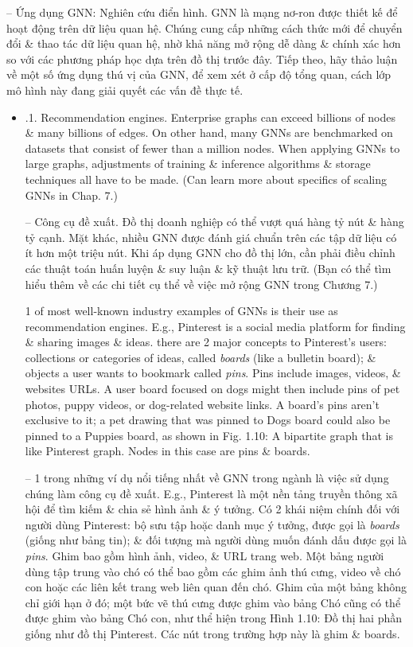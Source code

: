 \documentclass{article}
\begin{document}
\begin{itemize}
\begin{itemize}
        -- {\sf Ứng dụng GNN: Nghiên cứu điển hình.} GNN là mạng nơ-ron được thiết kế để hoạt động trên dữ liệu quan hệ. Chúng cung cấp những cách thức mới để chuyển đổi \& thao tác dữ liệu quan hệ, nhờ khả năng mở rộng dễ dàng \& chính xác hơn so với các phương pháp học dựa trên đồ thị trước đây. Tiếp theo, hãy thảo luận về một số ứng dụng thú vị của GNN, để xem xét ở cấp độ tổng quan, cách lớp mô hình này đang giải quyết các vấn đề thực tế.
        \begin{itemize}
            \item {.1. Recommendation engines.} Enterprise graphs can exceed billions of nodes \& many billions of edges. On other hand, many GNNs are benchmarked on datasets that consist of fewer than a million nodes. When applying GNNs to large graphs, adjustments of training \& inference algorithms \& storage techniques all have to be made. (Can learn more about specifics of scaling GNNs in Chap. 7.)

            -- {\sf Công cụ đề xuất.} Đồ thị doanh nghiệp có thể vượt quá hàng tỷ nút \& hàng tỷ cạnh. Mặt khác, nhiều GNN được đánh giá chuẩn trên các tập dữ liệu có ít hơn một triệu nút. Khi áp dụng GNN cho đồ thị lớn, cần phải điều chỉnh các thuật toán huấn luyện \& suy luận \& kỹ thuật lưu trữ. (Bạn có thể tìm hiểu thêm về các chi tiết cụ thể về việc mở rộng GNN trong Chương 7.)

            1 of most well-known industry examples of GNNs is their use as recommendation engines. E.g., Pinterest is a social media platform for finding \& sharing images \& ideas. there are 2 major concepts to Pinterest's users: collections or categories of ideas, called {\it boards}  (like a bulletin board); \& objects a user wants to bookmark called {\it pins}. Pins include images, videos, \& websites URLs. A user board focused on dogs might then include pins of pet photos, puppy videos, or dog-related website links. A board's pins aren't exclusive to it; a pet drawing that was pinned to Dogs board could also be pinned to a Puppies board, as shown in {\sf Fig. 1.10: A bipartite graph that is like Pinterest graph. Nodes in this case are pins \& boards}.

            -- 1 trong những ví dụ nổi tiếng nhất về GNN trong ngành là việc sử dụng chúng làm công cụ đề xuất. E.g., Pinterest là một nền tảng truyền thông xã hội để tìm kiếm \& chia sẻ hình ảnh \& ý tưởng. Có 2 khái niệm chính đối với người dùng Pinterest: bộ sưu tập hoặc danh mục ý tưởng, được gọi là {\it boards} (giống như bảng tin); \& đối tượng mà người dùng muốn đánh dấu được gọi là {\it pins}. Ghim bao gồm hình ảnh, video, \& URL trang web. Một bảng người dùng tập trung vào chó có thể bao gồm các ghim ảnh thú cưng, video về chó con hoặc các liên kết trang web liên quan đến chó. Ghim của một bảng không chỉ giới hạn ở đó; một bức vẽ thú cưng được ghim vào bảng Chó cũng có thể được ghim vào bảng Chó con, như thể hiện trong {\sf Hình 1.10: Đồ thị hai phần giống như đồ thị Pinterest. Các nút trong trường hợp này là ghim \& boards}.


\end{itemize}
\end{itemize}
\end{itemize}
\end{document}
